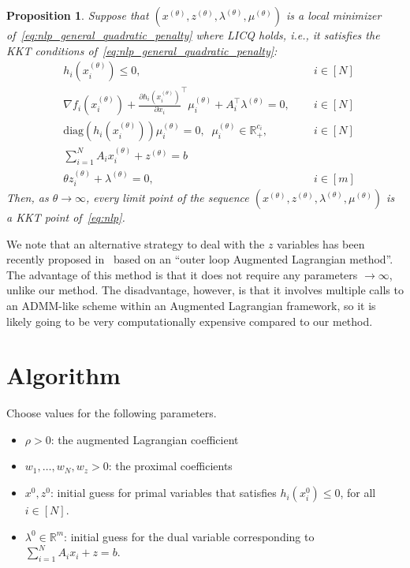 \documentclass[11pt]{article}
\newtheorem{prop}{Proposition}
\begin{document}
\begin{prop}
    Suppose that $(x^{(\theta)}, z^{(\theta)}, \lambda^{(\theta)}, \mu^{(\theta)})$ is a local minimizer of~\eqref{eq:nlp_general_quadratic_penalty} where LICQ holds, i.e., it satisfies the KKT conditions of~\eqref{eq:nlp_general_quadratic_penalty}:
    \begin{subequations}\label{eq:kkt_penalty}
        \begin{align}
        & h_i(x_i^{(\theta)}) \leq 0, \;\; && i \in [N] \label{eq:kkt_penalty:primal}\\
        & \nabla f_i(x_i^{(\theta)}) + \frac{\partial h_i(x_i^{(\theta)})}{\partial x_i}^\top \mu_i^{(\theta)} + A_i^\top \lambda^{(\theta)} = 0, \;\; && i \in [N]\label{eq:kkt_penalty:lagrangian_x} \\
        & \mathrm{diag}(h_i(x_i^{(\theta)})) \mu_i^{(\theta)} = 0, \;\;\mu_i^{(\theta)} \in \mathbb{R}^{c_i}_{+}, \;\; && i \in [N]\label{eq:kkt_penalty:complementarity} \\
        & \sum_{i = 1}^N A_i x_i^{(\theta)} + z^{(\theta)} = b \label{eq:kkt_penalty:coupling_primal}\\
        & \theta z_i^{(\theta)} + \lambda^{(\theta)} = 0, \;\; && i \in [m] \label{eq:kkt_penalty:lagrangian_z}
        \end{align}
    \end{subequations}
    Then, as $\theta \to \infty$, every limit point of the sequence $(x^{(\theta)}, z^{(\theta)}, \lambda^{(\theta)}, \mu^{(\theta)})$ is a KKT point of~\eqref{eq:nlp}.
\end{prop}

We note that an alternative strategy to deal with the $z$ variables has been recently proposed in~\cite{sun2019two} based on an ``outer loop Augmented Lagrangian method''.
The advantage of this method is that it does not require any parameters $\to \infty$, unlike our method.
The disadvantage, however, is that it involves multiple calls to an ADMM-like scheme within an Augmented Lagrangian framework, so it is likely going to be very computationally expensive compared to our method.



\section{Algorithm}
Choose values for the following parameters.
\begin{itemize}
    \item $\rho > 0$: the augmented Lagrangian coefficient
    \item $w_1, \ldots, w_N, w_z > 0$: the proximal coefficients
    \item $x^0, z^0$: initial guess for primal variables that satisfies $h_i(x^0_i) \leq 0$, for all $i \in [N]$.
    \item $\lambda^0 \in \mathbb{R}^{m}$: initial guess for the dual variable corresponding to $\sum_{i = 1}^N A_i x_i + z = b$.
\end{itemize}
\end{document}
